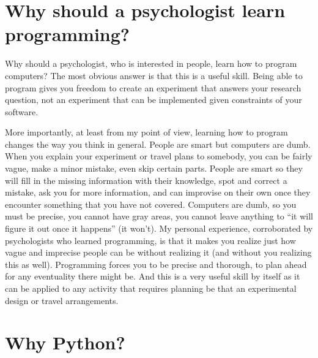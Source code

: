 \documentclass[
]{book}
\begin{document}
\hypertarget{why-should-a-psychologist-learn-programming}{%
\section{Why should a psychologist learn programming?}\label{why-should-a-psychologist-learn-programming}}

Why should a psychologist, who is interested in people, learn how to program computers? The most obvious answer is that this is a useful skill. Being able to program gives you freedom to create an experiment that answers your research question, not an experiment that can be implemented given constraints of your software.

More importantly, at least from my point of view, learning how to program changes the way you think in general. People are smart but computers are dumb. When you explain your experiment or travel plans to somebody, you can be fairly vague, make a minor mistake, even skip certain parts. People are smart so they will fill in the missing information with their knowledge, spot and correct a mistake, ask you for more information, and can improvise on their own once they encounter something that you have not covered. Computers are dumb, so you must be precise, you cannot have gray areas, you cannot leave anything to ``it will figure it out once it happens'' (it won't). My personal experience, corroborated by psychologists who learned programming, is that it makes you realize just how vague and imprecise people can be without realizing it (and without you realizing this as well). Programming forces you to be precise and thorough, to plan ahead for any eventuality there might be. And this is a very useful skill by itself as it can be applied to any activity that requires planning be that an experimental design or travel arrangements.

\hypertarget{why-python}{%
\section{Why Python?}\label{why-python}}
\end{document}
